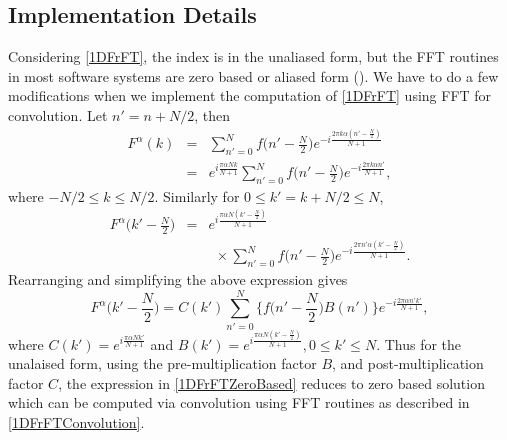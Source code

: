 \documentclass{UCF_ETD}
\begin{document}
 \subsection{Implementation Details}
 Considering \eqref{1DFrFT}, the index is in the unaliased form, but the FFT routines in most software systems are zero based or aliased form (\cite{Bailey1991}). We have to do a few modifications when we implement the computation of \eqref{1DFrFT} using FFT for convolution. Let $n' = n + N/2$, then
 \begin{eqnarray*}
 F^{\alpha}(k) &=& \sum\limits_{n'=0}^{N} f\Big(n' - \frac{N}{2}\Big) e^{-i\frac{2\pi k\alpha (n' - \frac{N}{2})}{N+1}} \\
 &=& e^{i\frac{\pi \alpha N k}{N+1} } \sum\limits_{n'=0}^{N} f\Big(n' - \frac{N}{2}\Big) e^{-i\frac{2\pi k\alpha n'}{N+1}} , \end{eqnarray*}
 where $-{N}/{2} \leq k \leq {N}/{2}$. Similarly  for  $0\le k' = k +{N}/{2}\leq N$, %
 \begin{eqnarray*}
 F^{\alpha}\Big(k' -\frac{N}{2}\Big) &=& e^{i\frac{\pi \alpha N (k' - \frac{N}{2})}{N+1} } \\
 & & \ \ \times \sum\limits_{n'=0}^{N} f\Big(n' -\frac{N}{2}\Big) e^{-i\frac{2\pi n'\alpha (k' - \frac{N}{2})}{N+1}}.
 \end{eqnarray*}
 Rearranging and simplifying the above expression gives
 \begin{equation}  \label{1DFrFTZeroBased}
 F^{\alpha}\Big(k' -\frac{N}{2}\Big) = C(k') \sum\limits_{n'=0}^{N} \Big\{ f\Big(n' - \frac{N}{2}\Big) B(n')\Big \}  e^{-i\frac{2\pi \alpha n' k'}{N+1}},
 \end{equation}
 where
  $C(k') =  e^{i\frac{\pi \alpha N k'}{N+1} }$ and $B(k') = e^{i\frac{\pi \alpha N (k' - \frac{N}{2})}{N+1} },
   0 \leq k' \leq N $.
 Thus for the unalaised form, using the pre-multiplication factor $B$, and post-multiplication factor $C$, the expression in \eqref{1DFrFTZeroBased} reduces to zero based solution which can be computed via convolution using FFT routines as described in \eqref{1DFrFTConvolution}.
 
\end{document}
